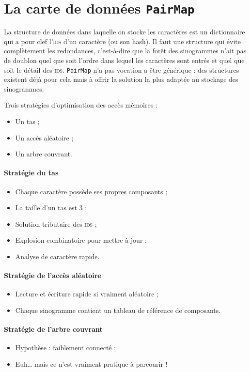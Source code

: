 \section{La carte de données \texttt{PairMap}}

La structure de données dans laquelle on stocke les caractères est un dictionnaire qui a pour clef l'\textsc{ids} d'un caractère (ou son hash). Il faut une structure qui évite complètement les redondances, c'est-à-dire que la forêt des sinogrammes n'ait pas de doublon quel que soit l'ordre dans lequel les caractères sont entrés et quel que soit le détail des \textsc{ids}. \texttt{PairMap} n'a pas vocation a être générique : des structures existent déjà pour cela mais à offrir la solution la plus adaptée au stockage des sinogrammes.

Trois stratégies d'optimisation des accès mémoires :
\begin{itemize}
\item Un tas ;
\item Un accès aléatoire ;
\item Un arbre couvrant.
\end{itemize}

\paragraph{Stratégie du tas}
\begin{itemize}
\item Chaque caractère possède ses propres composants ;
\item La taille d'un tas est 3 ;
\item Solution tributaire des \textsc{ids} ;
\item Explosion combinatoire pour mettre à jour ;
\item Analyse de caractère rapide.
\end{itemize}

\paragraph{Stratégie de l'accès aléatoire}
\begin{itemize}
\item Lecture et écriture rapide si vraiment aléatoire ;
\item Chaque sinogramme contient un tableau de référence de composants.
\end{itemize}

\paragraph{Stratégie de l'arbre couvrant}
\begin{itemize}
\item Hypothèse : faiblement connecté ;
\item Euh\dots{} mais ce n'est vraiment pratique à parcourir !
\end{itemize}

